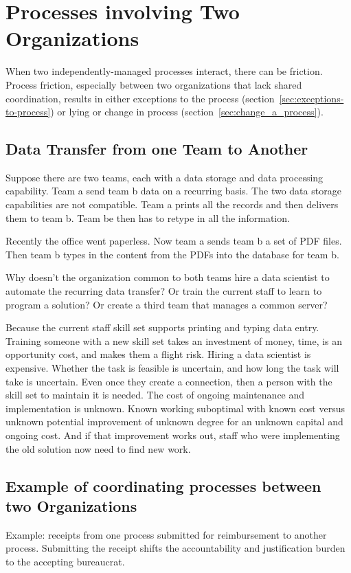 \section{Processes involving Two Organizations\label{sec:processes-two-organizations}}

When two independently-managed processes interact, there can be friction. Process friction, especially between two  organizations that lack shared coordination, results in either exceptions to the process (section~\ref{sec:exceptions-to-process}) or lying or change in process (section~\ref{sec:change_a_process}). 

\subsection*{Data Transfer from one Team to Another}

Suppose there are two teams, each with a data storage and data processing capability. Team a send team b data on a recurring basis. The two data storage capabilities are not compatible. Team a prints all the records and then delivers them to team b. Team be then has to retype in all the information.

Recently the office went paperless. Now team a sends team b a set of PDF files. Then team b types in the content from the PDFs into the database for team b.

Why doesn't the organization common to both teams hire a data scientist to automate the recurring data transfer? Or train the current staff to learn to program a solution? Or create a third team that manages a common server?

Because the current staff skill set supports printing and typing data entry. Training someone with a new skill set takes an investment of money, time, is an opportunity cost, and makes them a flight risk.
Hiring a data scientist is expensive. Whether the task is feasible is uncertain, and how long the task will take is uncertain. Even once they create a connection, then a person with the skill set to maintain it is needed. The cost of ongoing maintenance and implementation is unknown.
Known working suboptimal with known cost versus unknown potential improvement of unknown degree for an unknown capital and ongoing cost. And if that improvement works out, staff who were implementing the old solution now need to find new work.

\subsection*{Example of coordinating processes between two Organizations}
Example: receipts from one process submitted for reimbursement to another process.
Submitting the receipt shifts the accountability and justification burden to the accepting bureaucrat.



